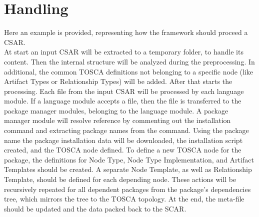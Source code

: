 \section*{Handling}
Here an example is provided, representing how the framework should proceed a CSAR.\\
At start an input CSAR will be extracted to a temporary folder, to handle its content.
Then the internal structure will be analyzed during the preprocessing. In additional, the common TOSCA definitions not belonging to a specific node (like Artifact Types or Relationship Types) will be added. 
After that starts the processing. Each file from the input CSAR will be processed by each language module.
If a language module accepts a file, then the file is transferred to the package manager modules, belonging to the language module.
A package manager module will resolve reference by commenting out the installation command and extracting package names from the command.
Using the package name the package installation data will be downloaded, the installation script created, and the TOSCA node defined. 
To define a new TOSCA node for the package, the definitions for Node Type, Node Type Implementation, and Artifact Templates should be created. 
A separate Node Template, as well as Relationship Template, should be defined for each depending node.
These actions will be recursively repeated for all dependent packages from the package's dependencies tree, which mirrors the tree to the TOSCA topology.
At the end, the meta-file should be updated and the data packed back to the SCAR.\\
